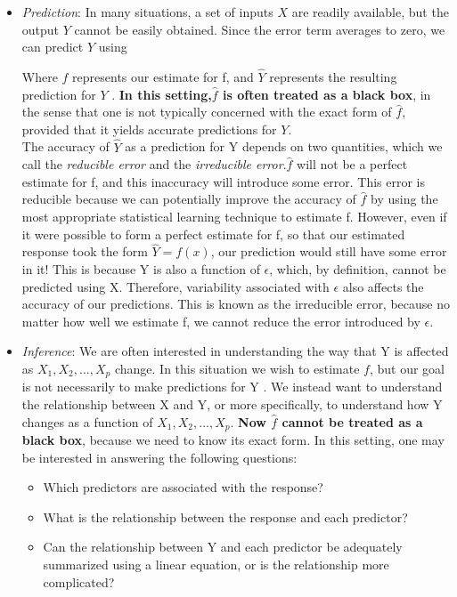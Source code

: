 \documentclass[12pt,a4paper]{article}
\begin{document}
\begin{itemize}
\item \textit{Prediction}: In many situations, a set of inputs $X$ are readily available, but the output $Y$ cannot be easily obtained. Since the error term averages to zero, we can predict $Y$ using
\begin{center}
\end{center}
Where $\hat{f}$ represents our estimate for f, and $\hat{Y}$ represents the resulting prediction for $Y$ . \textbf{In this setting,$\hat{f}$ is often treated as a black box}, in the sense that one is not typically concerned with the exact form of $\hat{f}$, provided that it yields accurate predictions for $Y$.\\
\newline
The accuracy of $\hat{Y}$ as a prediction for Y depends on two quantities, which we call the \textit{reducible error} and the \textit{irreducible error}.$\hat{f}$ will not be a perfect estimate for f, and this inaccuracy will introduce some error. This error is reducible because we can potentially improve the accuracy of $\hat{f}$ by using the most appropriate statistical learning technique to estimate f. However, even if it were possible to form a perfect estimate for f, so that our estimated response took the form $\hat{Y}=f(x)$, our prediction would still have some error in it! This is because Y is also a function of $\epsilon$, which, by definition, cannot be predicted using X. Therefore, variability associated with $\epsilon$ also affects the accuracy of our predictions. This is known as the irreducible error, because no matter how well we estimate f, we cannot reduce the error introduced by $\epsilon$.

\item \textit{Inference}: We are often interested in understanding the way that Y is affected as $X_{1},X_{2},...,X_{p}$ change. In this situation we wish to estimate $f$, but our goal is not necessarily to make predictions for Y . We instead want to understand the relationship between X and Y, or more specifically, to understand how Y changes as a function of $X_{1},X_{2},...,X_{p}$. \textbf{Now $\hat{f}$ cannot be treated as a black box}, because we need to know its exact form. In this setting, one may be interested in answering the following questions:
\begin{itemize}
\item Which predictors are associated with the response? 
\item What is the relationship between the response and each predictor? 
\item Can the relationship between Y and each predictor be adequately summarized using a linear equation, or is the relationship more complicated?
\end{itemize}
\end{itemize}
\end{document}
